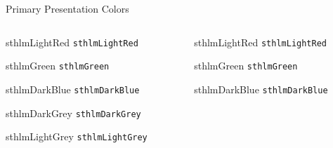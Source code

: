 \documentclass[compress,PxFont]{beamer}
\begin{document}
\begin{frame}{Primary Presentation Colors}

\begin{columns}
\begin{column}{.48\linewidth}
	
\begin{beamercolorbox}[wd=\linewidth,ht=2ex,dp=0.7ex]{sthlmLightRed}
	\texttt{sthlmLightRed}
\end{beamercolorbox}

\begin{beamercolorbox}[wd=\linewidth,ht=2ex,dp=0.7ex]{sthlmGreen}
	\texttt{sthlmGreen}
\end{beamercolorbox}

\begin{beamercolorbox}[wd=\linewidth,ht=2ex,dp=0.7ex]{sthlmDarkBlue}
	\texttt{sthlmDarkBlue}
\end{beamercolorbox}

\begin{beamercolorbox}[wd=\linewidth,ht=2ex,dp=0.7ex]{sthlmDarkGrey}
	\texttt{sthlmDarkGrey}
\end{beamercolorbox}

\begin{beamercolorbox}[wd=\linewidth,ht=2ex,dp=0.7ex]{sthlmLightGrey}
	\texttt{sthlmLightGrey}
\end{beamercolorbox}

\end{column}

\begin{column}{.48\linewidth}
\begin{beamercolorbox}[wd=\linewidth,ht=2ex,dp=0.7ex]{sthlmLightRed}
	\texttt{sthlmLightRed}
\end{beamercolorbox}

\begin{beamercolorbox}[wd=\linewidth,ht=2ex,dp=0.7ex]{sthlmGreen}
	\texttt{sthlmGreen}
\end{beamercolorbox}

\begin{beamercolorbox}[wd=\linewidth,ht=2ex,dp=0.7ex]{sthlmDarkBlue}
	\texttt{sthlmDarkBlue}
\end{beamercolorbox}


\end{column}
\end{columns}
\end{frame}
\end{document}
